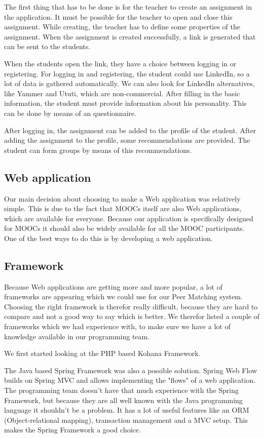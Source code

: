 The first thing that has to be done is for the teacher to create an assignment in the application.
It must be possible for the teacher to open and close this assignment. 
While creating, the teacher has to define some properties of the assignment.
When the assignment is created successfully, a link is generated that can be sent to the students.

When the students open the link, they have a choice between logging in or registering.
For logging in and registering, the student could use LinkedIn, so a lot of data is gathered automatically.
We can also look for LinkedIn alternatives, like Yammer and Ututi, which are non-commercial.
After filling in the basic information, the student must provide information about his personality.
This can be done by means of an questionnaire.

After logging in, the assignment can be added to the profile of the student.
After adding the assignment to the profile, some recommendations are provided.
The student can form groups by means of this recommendations.

\subsection*{Web application}
Our main decision about choosing to make a Web application was relatively simple.
This is due to the fact that MOOCs itself are also Web applications, which are available for everyone.
Because our application is specifically designed for MOOCs it should also be widely available for all the MOOC participants.
One of the best ways to do this is by developing a web application.

\subsection*{Framework}
Because Web applications are getting more and more popular, a lot of frameworks are appearing which we could use for our Peer Matching system.
Choosing the right framework is therefor really difficult, because they are hard to compare and not a good way to say which is better.
We therefor listed a couple of frameworks which we had experience with, to make sure we have a lot of knowledge available in our programming team.

We first started looking at the PHP based Kohana Framework\cite{kohana}.

The Java based Spring Framework\cite{spring} was also a possible solution.
Spring Web Flow builds on Spring MVC and allows implementing the "flows" of a web application.
The programming team doesn't have that much experience with the Spring Framework, but because they are all well known with the Java programming language it shouldn't be a problem.
It has a lot of useful features like an ORM (Object-relational mapping), transaction management and a MVC setup.
This makes the Spring Framework a good choice.

